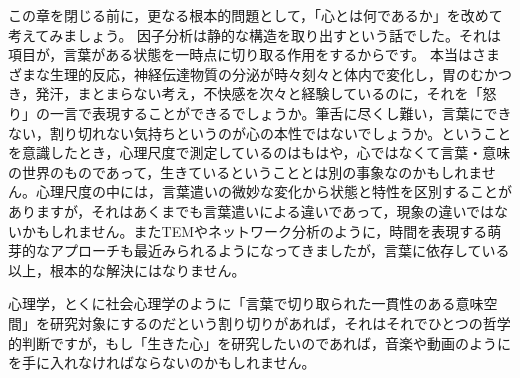 \documentclass{ltjsbook}
\begin{document}
この章を閉じる前に，更なる根本的問題として，「心とは何であるか」を改めて考えてみましょう。
因子分析は静的な構造を取り出すという話でした。それは項目が，言葉がある状態を一時点に切り取る作用をするからです。
本当はさまざまな生理的反応，神経伝達物質の分泌が時々刻々と体内で変化し，胃のむかつき，発汗，まとまらない考え，不快感を次々と経験しているのに，それを「怒り」の一言で表現することができるでしょうか。筆舌に尽くし難い，言葉にできない，割り切れない気持ちというのが心の本性ではないでしょうか。ということを意識したとき，心理尺度で測定しているのはもはや，心ではなくて言葉・意味の世界のものであって，生きているということとは別の事象なのかもしれません。心理尺度の中には，言葉遣いの微妙な変化から状態と特性を区別することがありますが，それはあくまでも言葉遣いによる違いであって，現象の違いではないかもしれません。またTEMやネットワーク分析のように，時間を表現する萌芽的なアプローチも最近みられるようになってきましたが，言葉に依存している以上，根本的な解決にはなりません。

心理学，とくに社会心理学のように「言葉で切り取られた一貫性のある意味空間」を研究対象にするのだという割り切りがあれば，それはそれでひとつの哲学的判断ですが，もし「生きた心」を研究したいのであれば，音楽や動画のようにを手に入れなければならないのかもしれません。



\end{document}
